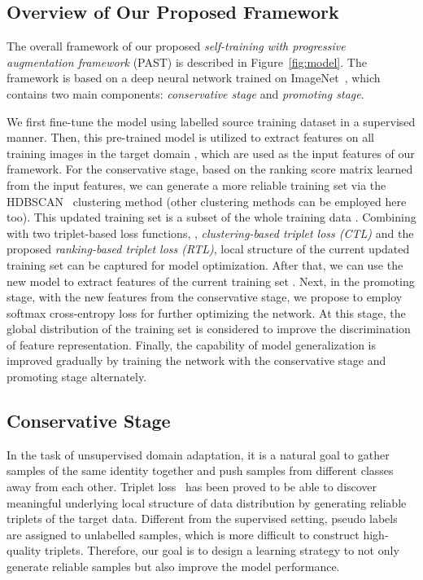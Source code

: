 \documentclass[10pt,twocolumn,letterpaper]{article}
\begin{document}
\subsection{Overview of Our Proposed Framework} 
The overall framework of our proposed \emph{self-training with progressive augmentation framework} (PAST) is described in Figure~\ref{fig:model}. 
The framework is based on a deep neural network  trained on ImageNet~\cite{imagenet}, which contains two main components: \emph{conservative stage} and \emph{promoting stage}. 

We first fine-tune the model  using labelled source training dataset  in a supervised manner. 
Then, this pre-trained model is utilized to extract features  on all training images in the target domain , which are used as the input features of our framework. 
For the conservative stage, based on the ranking score matrix  learned from the input features, we can generate a more reliable training set  via the HDBSCAN~\cite{HDBSCAN} clustering method (other clustering methods can be employed here too). 
This updated training set  is a subset of the whole training data . Combining with two triplet-based loss functions, \ie, \emph{clustering-based triplet loss (CTL)} and the proposed \emph{ranking-based triplet loss (RTL)}, local structure of the current updated training set can be captured for model optimization. 
After that, we can use the new model to extract features  of the current training set .
Next, in the promoting stage, with the new features  from the conservative stage, we propose to employ softmax cross-entropy loss for further optimizing the network. 
At this stage, the global distribution of the training set is considered to improve the discrimination of feature representation.
Finally, the capability of model generalization is improved gradually by training the network with the conservative stage and promoting stage alternately.

\subsection{Conservative Stage}
In the task of unsupervised domain adaptation, it is a natural goal to gather samples of the same identity together and push samples from different classes away from each other. 
Triplet loss~\cite{HHL, theory, tfusion} has been proved to be able to discover meaningful underlying local structure of data distribution by generating reliable triplets of the target data. 
Different from the supervised setting, pseudo labels are assigned to unlabelled samples, which is more difficult to construct high-quality triplets. 
Therefore, our goal is to design a learning strategy to not only generate reliable samples but also improve the model performance. 
\end{document}
